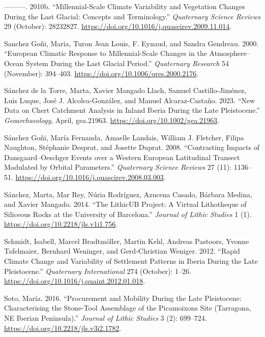 \documentclass[
  a4paper,
  DIV=11,
  numbers=noendperiod]{scrreprt}
\newlength{\cslhangindent}
\newenvironment{CSLReferences}[2] %
 {\begin{list}{}{%
  \setlength{\itemindent}{0pt}
  \setlength{\leftmargin}{0pt}
  \setlength{\parsep}{0pt}
  \ifodd #1
   \setlength{\leftmargin}{\cslhangindent}
   \setlength{\itemindent}{-1\cslhangindent}
  \fi
  \setlength{\itemsep}{#2\baselineskip}}}
 {\end{list}}
\begin{document}
\begin{CSLReferences}{1}{0}
---------. 2010b. {``Millennial-Scale Climate Variability and Vegetation
Changes During the Last Glacial: Concepts and Terminology.''}
\emph{Quaternary Science Reviews} 29 (October): 28232827.
\url{https://doi.org/10.1016/j.quascirev.2009.11.014}.

Sanchez Goñi, Maria, Turon Jean Louis, F. Eynaud, and Sandra Gendreau.
2000. {``European Climatic Response to Millennial-Scale Changes in the
Atmosphere--Ocean System During the Last Glacial Period.''}
\emph{Quaternary Research} 54 (November): 394--403.
\url{https://doi.org/10.1006/qres.2000.2176}.

Sánchez de la Torre, Marta, Xavier Mangado Llach, Samuel
Castillo-Jiménez, Luis Luque, José J. Alcolea-González, and Manuel
Alcaraz-Castaño. 2023. {``New Data on Chert Catchment Analysis in Inland
{Iberia} During the {Late Pleistocene}.''} \emph{Geoarchaeology}, April,
gea.21963. \url{https://doi.org/10.1002/gea.21963}.

Sánchez Goñi, María Fernanda, Amaelle Landais, William J. Fletcher,
Filipa Naughton, Stéphanie Desprat, and Josette Duprat. 2008.
{``Contrasting Impacts of Dansgaard--Oeschger Events over a Western
European Latitudinal Transect Modulated by Orbital Parameters.''}
\emph{Quaternary Science Reviews} 27 (11): 1136--51.
\url{https://doi.org/10.1016/j.quascirev.2008.03.003}.

Sánchez, Marta, Mar Rey, Núria Rodríguez, Azucena Casado, Bárbara
Medina, and Xavier Mangado. 2014. {``The {LithicUB} Project: {A} Virtual
Lithotheque of Siliceous Rocks at the {University} of {Barcelona}.''}
\emph{Journal of Lithic Studies} 1 (1).
\url{https://doi.org/10.2218/jls.v1i1.756}.

Schmidt, Isabell, Marcel Bradtmöller, Martin Kehl, Andreas Pastoors,
Yvonne Tafelmaier, Bernhard Weninger, and Gerd-Christian Weniger. 2012.
{``Rapid Climate Change and Variability of Settlement Patterns in
{Iberia} During the {Late Pleistocene}.''} \emph{Quaternary
International} 274 (October): 1--26.
\url{https://doi.org/10.1016/j.quaint.2012.01.018}.

Soto, María. 2016. {``Procurement and Mobility During the {Late
Pleistocene}: {Characterising} the Stone-Tool Assemblage of the
{Picamoixons} Site ({Tarragona}, {NE Iberian Peninsula}).''}
\emph{Journal of Lithic Studies} 3 (2): 699--724.
\url{https://doi.org/10.2218/jls.v3i2.1782}.


\end{CSLReferences}
\end{document}
